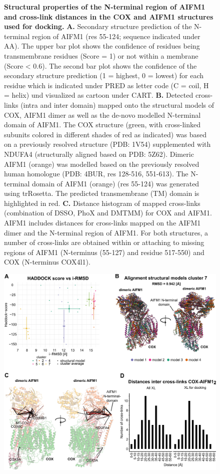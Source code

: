 \begin{subappendices}
\begin{figure}[htb]
		\caption{\textbf{Structural properties of the N-terminal region of AIFM1 and cross-link distances in the COX and AIFM1 structures used for docking.} \textbf{A.} Secondary structure prediction of the N-terminal region of AIFM1 (res 55-124; sequence indicated under AA). The upper bar plot shows the confidence of residues being transmembrane residues (Score = 1) or not within a membrane (Score < 0.6). The second bar plot shows the confidence of the secondary structure prediction (1 = highest, 0 = lowest) for each residue which is indicated under PRED as letter code (C = coil, H = helix) und visualized as cartoon under CART. \textbf{B.} Detected cross-links (intra and inter domain) mapped onto the structural models of COX, AIFM1 dimer as well as the de-novo modelled N-terminal domain of AIFM1. The COX structure (green, with cross-linked subunits colored in different shades of red as indicated) was based on a previously resolved structure (PDB: 1V54) supplemented with NDUFA4 (structurally aligned based on PDB: 5Z62). Dimeric AIFM1 (orange) was modelled based on the previously resolved human homologue (PDB: 4BUR, res 128-516, 551-613). The N-terminal domain of AIFM1 (orange) (res 55-124) was generated using trRosetta. The predicted transmembrane (TM) domain is highlighted in red. \textbf{C.} Distance histogram of mapped cross-links (combination of DSSO, PhoX and DMTMM) for COX and AIFM1. AIFM1 includes distances for cross-links mapped on the AIFM1 dimer and the N-terminal region of AIFM1. For both structures, a number of cross-links are obtained within or attaching to missing regions of AIFM1 (N-terminus (55-127) and residue 517-550) and COX (N-terminus COX4l1).}
		\label{fig:ch3_app_fig3}
	\end{figure}
	\begin{figure}[htb]
		\center
		\includegraphics[]{Chapter.3/Figures/SI_Figure4.png}

\end{figure}
\end{subappendices}
